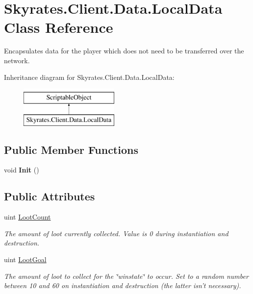 \hypertarget{class_skyrates_1_1_client_1_1_data_1_1_local_data}{\section{Skyrates.\-Client.\-Data.\-Local\-Data Class Reference}
\label{class_skyrates_1_1_client_1_1_data_1_1_local_data}
}


Encapsulates data for the player which does not need to be transferred over the network.  


Inheritance diagram for Skyrates.\-Client.\-Data.\-Local\-Data\-:\begin{figure}[H]
\begin{center}
\leavevmode
\includegraphics[height=2.000000cm]{class_skyrates_1_1_client_1_1_data_1_1_local_data}
\end{center}
\end{figure}
\subsection*{Public Member Functions}
\begin{DoxyCompactItemize}
\item 
\hypertarget{class_skyrates_1_1_client_1_1_data_1_1_local_data_a633fa2c9e67688f7edbb90821acc491e}{void {\bfseries Init} ()}\label{class_skyrates_1_1_client_1_1_data_1_1_local_data_a633fa2c9e67688f7edbb90821acc491e}

\end{DoxyCompactItemize}
\subsection*{Public Attributes}
\begin{DoxyCompactItemize}
\item 
uint \hyperlink{class_skyrates_1_1_client_1_1_data_1_1_local_data_aa073e9045fbadc0325944e19305c92e0}{Loot\-Count}
\begin{DoxyCompactList}\small\item\em The amount of loot currently collected. Value is 0 during instantiation and destruction. \end{DoxyCompactList}\item 
uint \hyperlink{class_skyrates_1_1_client_1_1_data_1_1_local_data_a5e0d6c1ab2838d69f03d3d1dbbe31450}{Loot\-Goal}
\begin{DoxyCompactList}\small\item\em The amount of loot to collect for the \char`\"{}winstate\char`\"{} to occur. Set to a random number between 10 and 60 on instantiation and destruction (the latter isn't necessary). \end{DoxyCompactList}\end{DoxyCompactItemize}



